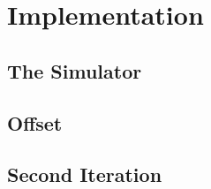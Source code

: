 \documentclass[12pt,a4paper]{article}
\begin{document}
\section{Implementation}
\subsection{The Simulator}
\subsection{Offset}
\subsection{Second Iteration}
\newpage


\cite{navaridas2009understanding}
\cite{sharp2012power}
\cite{davies2010interfacing}
\cite{sharp2011event}
\cite{gerstner2002spiking}
\cite{press2007numerical}
\cite{shewchuk1994introduction}
\cite{cgm2009lec}
\cite{o1987parallel}
\cite{adams1985m}
\cite{maheswaran1999mcgs}
\cite{yang2001improved}
\cite{adams1983m}
\cite{galiano2012gpu}
\cite{wozniak2010parallel}
\cite{hestenes1952methods}
\cite{rosenbloom1956method}
\cite{furber2007neural}
\cite{spinnweb}
\cite{khan2008spinnaker}
\cite{docfile}
\cite{plana2007gals}
\cite{furber2012overview}
\cite{bose2005spiking}
\cite{jefflec}
\cite{rast2012managing}
\end{document}
